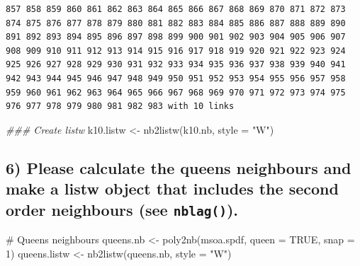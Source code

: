 \documentclass[
  letterpaper,
]{scrbook}
\newenvironment{Shaded}{\begin{snugshade}}{\end{snugshade}}
\newcommand{\AttributeTok}[1]{\textcolor[rgb]{0.40,0.45,0.13}{#1}}
\newcommand{\CommentTok}[1]{\textcolor[rgb]{0.37,0.37,0.37}{#1}}
\newcommand{\ConstantTok}[1]{\textcolor[rgb]{0.56,0.35,0.01}{#1}}
\newcommand{\DecValTok}[1]{\textcolor[rgb]{0.68,0.00,0.00}{#1}}
\newcommand{\DocumentationTok}[1]{\textcolor[rgb]{0.37,0.37,0.37}{\textit{#1}}}
\newcommand{\FunctionTok}[1]{\textcolor[rgb]{0.28,0.35,0.67}{#1}}
\newcommand{\NormalTok}[1]{\textcolor[rgb]{0.00,0.23,0.31}{#1}}
\newcommand{\OtherTok}[1]{\textcolor[rgb]{0.00,0.23,0.31}{#1}}
\newcommand{\StringTok}[1]{\textcolor[rgb]{0.13,0.47,0.30}{#1}}
\begin{document}
\begin{verbatim}
857 858 859 860 861 862 863 864 865 866 867 868 869 870 871 872 873 874 875 876 877 878 879 880 881 882 883 884 885 886 887 888 889 890 891 892 893 894 895 896 897 898 899 900 901 902 903 904 905 906 907 908 909 910 911 912 913 914 915 916 917 918 919 920 921 922 923 924 925 926 927 928 929 930 931 932 933 934 935 936 937 938 939 940 941 942 943 944 945 946 947 948 949 950 951 952 953 954 955 956 957 958 959 960 961 962 963 964 965 966 967 968 969 970 971 972 973 974 975 976 977 978 979 980 981 982 983 with 10 links
\end{verbatim}

\begin{Shaded}
\begin{Highlighting}[]
\DocumentationTok{\#\#\# Create listw}
\NormalTok{k10.listw }\OtherTok{\textless{}{-}} \FunctionTok{nb2listw}\NormalTok{(k10.nb, }\AttributeTok{style =} \StringTok{"W"}\NormalTok{)}
\end{Highlighting}
\end{Shaded}

\hypertarget{please-calculate-the-queens-neighbours-and-make-a-listw-object-that-includes-the-second-order-neighbours-see-nblag.}{%
\subsection*{\texorpdfstring{6) Please calculate the queens neighbours
and make a listw object that includes the second order neighbours (see
\texttt{nblag()}).}{6) Please calculate the queens neighbours and make a listw object that includes the second order neighbours (see nblag()).}}\label{please-calculate-the-queens-neighbours-and-make-a-listw-object-that-includes-the-second-order-neighbours-see-nblag.}}

\begin{Shaded}
\begin{Highlighting}[]
\CommentTok{\# Queens neighbours}
\NormalTok{queens.nb }\OtherTok{\textless{}{-}} \FunctionTok{poly2nb}\NormalTok{(msoa.spdf, }\AttributeTok{queen =} \ConstantTok{TRUE}\NormalTok{, }\AttributeTok{snap =} \DecValTok{1}\NormalTok{)}
\NormalTok{queens.listw }\OtherTok{\textless{}{-}} \FunctionTok{nb2listw}\NormalTok{(queens.nb, }\AttributeTok{style =} \StringTok{"W"}\NormalTok{)}
\end{Highlighting}
\end{Shaded}
\end{document}
